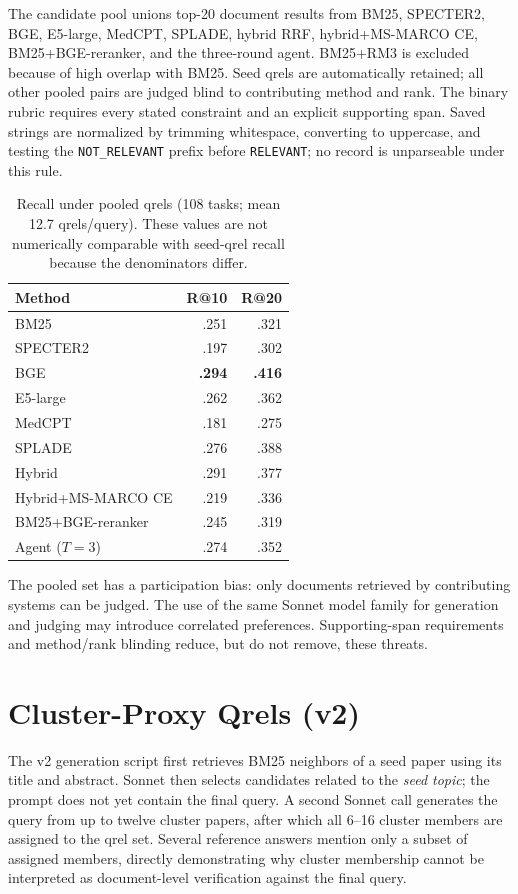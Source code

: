 \documentclass{article}
\begin{document}
The candidate pool unions top-20 document results from BM25, SPECTER2, BGE, E5-large, MedCPT, SPLADE, hybrid RRF, hybrid+MS-MARCO CE, BM25+BGE-reranker, and the three-round agent. BM25+RM3 is excluded because of high overlap with BM25. Seed qrels are automatically retained; all other pooled pairs are judged blind to contributing method and rank. The binary rubric requires every stated constraint and an explicit supporting span. Saved strings are normalized by trimming whitespace, converting to uppercase, and testing the \texttt{NOT\_RELEVANT} prefix before \texttt{RELEVANT}; no record is unparseable under this rule.

\begin{table}[h]
\centering
\caption{Recall under pooled qrels (108 tasks; mean 12.7 qrels/query). These values are not numerically comparable with seed-qrel recall because the denominators differ.}
\label{tab:pooled}
\small
\begin{tabular}{lrr}
\toprule
Method & R@10 & R@20 \\
\midrule
BM25 & .251 & .321 \\
SPECTER2 & .197 & .302 \\
BGE & \textbf{.294} & \textbf{.416} \\
E5-large & .262 & .362 \\
MedCPT & .181 & .275 \\
SPLADE & .276 & .388 \\
Hybrid & .291 & .377 \\
Hybrid+MS-MARCO CE & .219 & .336 \\
BM25+BGE-reranker & .245 & .319 \\
Agent ($T{=}3$) & .274 & .352 \\
\bottomrule
\end{tabular}
\end{table}

The pooled set has a participation bias: only documents retrieved by contributing systems can be judged. The use of the same Sonnet model family for generation and judging may introduce correlated preferences. Supporting-span requirements and method/rank blinding reduce, but do not remove, these threats.

\section{Cluster-Proxy Qrels (v2)}
\label{app:v2}

The v2 generation script first retrieves BM25 neighbors of a seed paper using its title and abstract. Sonnet then selects candidates related to the \emph{seed topic}; the prompt does not yet contain the final query. A second Sonnet call generates the query from up to twelve cluster papers, after which all 6--16 cluster members are assigned to the qrel set. Several reference answers mention only a subset of assigned members, directly demonstrating why cluster membership cannot be interpreted as document-level verification against the final query.
\end{document}
